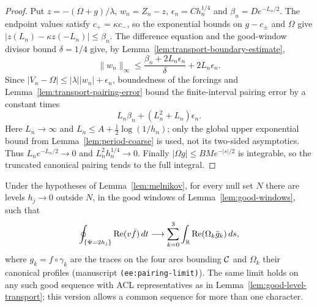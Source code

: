 \begin{proof}
\leanok
Put $z=-(\Omega+g)/\lambda$, $w_n=Z_n-z$,
$\epsilon_n=Ch_n^{1/4}$ and $\beta_n=De^{-L_n/2}$.
The endpoint values satisfy $c_+=\kappa c_-$, so the exponential bounds on
$g-c_\pm$ and $\Omega$ give
$|z(L_n)-\kappa z(-L_n)|\le\beta_n$.
The difference equation and the good-window divisor bound $\delta=1/4$
give, by Lemma~\ref{lem:transport-boundary-estimate},
\[
 \|w_n\|_\infty\le
   \frac{\beta_n+2L_n\epsilon_n}{\delta}+2L_n\epsilon_n.
\]
Since $|V_n-\Omega|\le|\lambda||w_n|+\epsilon_n$, boundedness of the forcings
and Lemma~\ref{lem:transport-pairing-error} bound the finite-interval pairing
error by a constant times
\[
 L_n\beta_n+(L_n^2+L_n)\epsilon_n.
\]
Here $L_n\to\infty$ and $L_n\le A+\tfrac12\log(1/h_n)$; only the global upper
exponential bound from Lemma~\ref{lem:period-coarse} is used, not its two-sided
asymptotics. Thus $L_ne^{-L_n/2}\to0$ and $L_n^2h_n^{1/4}\to0$.
Finally $|\Omega g|\le BM e^{-|s|/2}$ is integrable, so the truncated canonical
pairing tends to the full integral.
\end{proof}

\begin{lemma}
\label{lem:pairing-limit}
\leanok
Under the hypotheses of Lemma~\ref{lem:melnikov}, for every null set $N$ there are levels
$h_j\to0$ outside $N$, in the good windows of Lemma~\ref{lem:good-windows}, such that
\[
  \oint_{\{\Psi=2h_j\}}\operatorname{Re}(v\bar f)\,dt
  \longrightarrow\sum_{k=0}^{3}\int_{\mathbb{R}}\operatorname{Re}(\Omega_k\bar g_k)\,ds,
\]
where $g_k=f\circ\gamma_k$ are the traces on the four arcs bounding $\mathcal{C}$ and $\Omega_k$
their canonical profiles (manuscript \texttt{(ee:pairing-limit)}). The same
limit holds on any such good sequence with ACL representatives as in
Lemma~\ref{lem:good-level-transport}; this version allows a common sequence
for more than one character.
\end{lemma}

